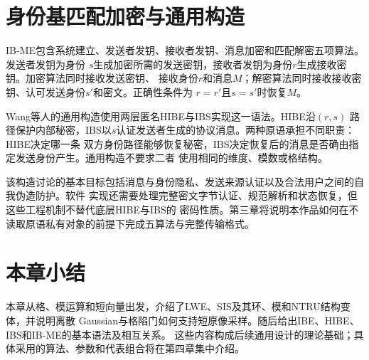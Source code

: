 \section{身份基匹配加密与通用构造}

IB-ME包含系统建立、发送者发钥、接收者发钥、消息加密和匹配解密五项算法。发送者发钥为身份
$s$生成加密所需的发送密钥，接收者发钥为身份$r$生成接收密钥。加密算法同时接收发送密钥、
接收身份$r$和消息$M$；解密算法同时接收接收密钥、认可发送身份$s'$和密文。正确性条件为
$r=r'$且$s=s'$时恢复$M$。

Wang等人的通用构造使用两层匿名HIBE与IBS实现这一语法\cite{wang2024ibme}。HIBE沿$(r,s)$
路径保护内部秘密，IBS以$s$认证发送者生成的协议消息。两种原语承担不同职责：HIBE决定哪一条
双方身份路径能够恢复秘密，IBS决定恢复后的消息是否确由指定发送身份产生。通用构造不要求二者
使用相同的维度、模数或格结构。

该构造讨论的基本目标包括消息与身份隐私、发送来源认证以及合法用户之间的自我伪造防护。软件
实现还需要处理完整密文字节认证、规范解析和状态恢复，但这些工程机制不替代底层HIBE与IBS的
密码性质。第三章将说明本作品如何在不读取原语私有对象的前提下完成五算法与完整传输格式。

\section{本章小结}

本章从格、模运算和短向量出发，介绍了LWE、SIS及其环、模和NTRU结构变体，并说明离散
Gaussian与格陷门如何支持短原像采样。随后给出IBE、HIBE、IBS和IB-ME的基本语法及相互关系。
这些内容构成后续通用设计的理论基础；具体采用的算法、参数和代表组合将在第四章集中介绍。
